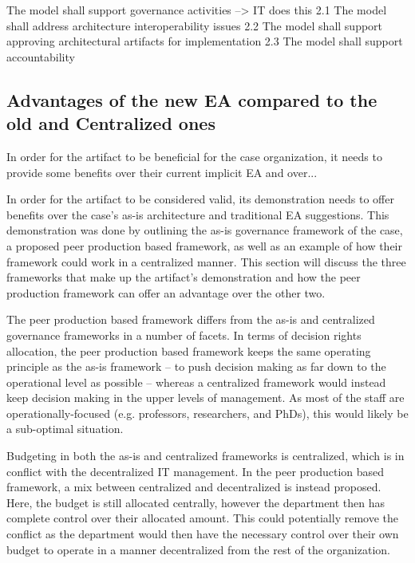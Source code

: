 The model shall support governance activities --> IT does this
2.1 The model shall address architecture interoperability issues
2.2 The model shall support approving architectural artifacts for implementation
2.3 The model shall support accountability


\subsection{Advantages of the new EA compared to the old and Centralized ones}

In order for the artifact to be beneficial for the case organization, it needs to provide some benefits over their current implicit EA and over... 

In order for the artifact to be considered valid, its demonstration needs to offer benefits over the case's as-is architecture and traditional EA suggestions. This demonstration was done by outlining the as-is governance framework of the case, a proposed peer production based framework, as well as an example of how their framework could work in a centralized manner. This section will discuss the three frameworks that make up the artifact's demonstration and how the peer production framework can offer an advantage over the other two. 


The peer production based framework differs from the as-is and centralized governance frameworks in a number of facets. In terms of decision rights allocation, the peer production based framework keeps the same operating principle as the as-is framework -- to push decision making as far down to the operational level as possible -- whereas a centralized framework would instead keep decision making in the upper levels of management. As most of the staff are operationally-focused (e.g. professors, researchers, and PhDs), this would likely be a sub-optimal situation. 

Budgeting in both the as-is and centralized frameworks is centralized, which is in conflict with the decentralized IT management. In the peer production based framework, a mix between  centralized and decentralized is instead proposed. Here, the budget is still allocated centrally, however the department then has complete control over their allocated amount. This could potentially remove the conflict as the department would then have the necessary control over their own budget to operate in a manner decentralized from the rest of the organization. 

